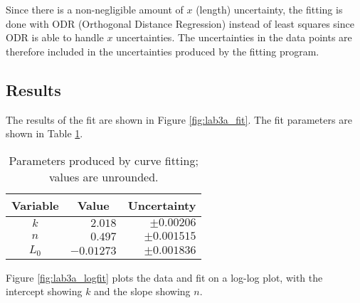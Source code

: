 \documentclass[aps,twocolumn,secnumarabic,nobalancelastpage,amsmath,amssymb,nofootinbib,floatfix,letterpaper]{revtex4}
\begin{document}
Since there is a non-negligible amount of \(x\) (length) uncertainty, the fitting is done with ODR (Orthogonal Distance
Regression) instead of least squares since ODR is able to handle \(x\) uncertainties. The uncertainties in the data
points are therefore included in the uncertainties produced by the fitting program.

\subsection{Results}
\label{sec:lab3a_results}

The results of the fit are shown in Figure \ref{fig:lab3a_fit}. The fit parameters are shown in Table \ref{table:lab3a_fit}.

\begin{table}[ht]
    \begin{tabular}{c|r|r}
        Variable & \multicolumn{1}{c|}{Value} & \multicolumn{1}{c}{Uncertainty} \\
        \hline
        \(k\) & \(2.018\) & \(\pm 0.00206\) \\
        \(n\) & \(0.497\) & \(\pm 0.001515\) \\
        \(L_0\) & \(-0.01273\) & \(\pm 0.001836\) \\
    \end{tabular}
    \caption{Parameters produced by curve fitting; values are unrounded.}
    \label{table:lab3a_fit}
\end{table}

Figure \ref{fig:lab3a_logfit} plots the data and fit on a log-log plot, with the intercept showing \(k\) and the slope
showing \(n\).
\end{document}
